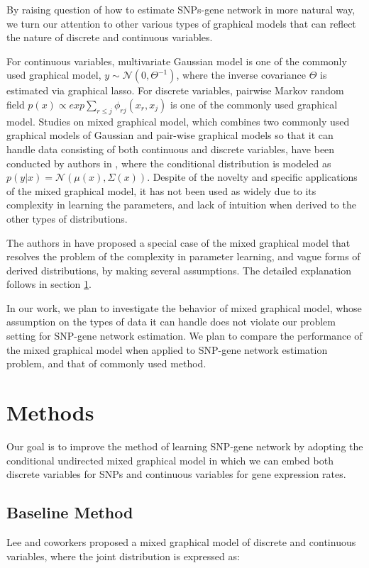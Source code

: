 \documentclass{article}
\begin{document}
By raising question of how to estimate SNPs-gene network in more natural way, we turn our attention to other various types of graphical models that can reflect the nature of discrete and continuous variables. 

For continuous variables, multivariate Gaussian model is one of the commonly used graphical model, $y \sim \mathcal{N}(0, \Theta^{-1})$, where the inverse covariance $\Theta$ is estimated via graphical lasso. For discrete variables, pairwise Markov random field $p(x) \propto exp \sum_{r\leq j} \phi_{rj}(x_r, x_j)$ is one of the commonly used graphical model.
Studies on mixed graphical model, which combines two commonly used graphical models of Gaussian and pair-wise graphical models so that it can handle data consisting of both continuous and discrete variables, have been conducted by authors in \cite{lauritzen1989graphical}, where the conditional distribution is modeled as $p(y|x) = \mathcal{N}(\mu(x), \Sigma(x))$. 
Despite of the novelty and specific applications of the mixed graphical model, it has not been used as widely due to its complexity in learning the parameters, and lack of intuition when derived to the other types of distributions.

The authors in \cite{lee2013structure} have proposed a special case of the mixed graphical model that resolves the problem of the complexity in parameter learning, and vague forms of derived distributions, by making several assumptions.
 The detailed explanation follows in section \ref{Methods}.
 
In our work, we plan to investigate the behavior of mixed graphical model, whose assumption on the types of data it can handle does not violate our problem setting for SNP-gene network estimation. We plan to compare the performance of the mixed graphical model when applied to SNP-gene network estimation problem, and that of commonly used method.




\section{Methods}
\label{Methods}
Our goal is to improve the method of learning SNP-gene network by adopting the conditional undirected mixed graphical model in which we can embed both discrete variables for SNPs and continuous variables for gene expression rates.

\subsection{Baseline Method}
Lee and coworkers \cite{lee2013structure} proposed a mixed graphical model of discrete and continuous variables, where the joint distribution is expressed as:
\end{document}
